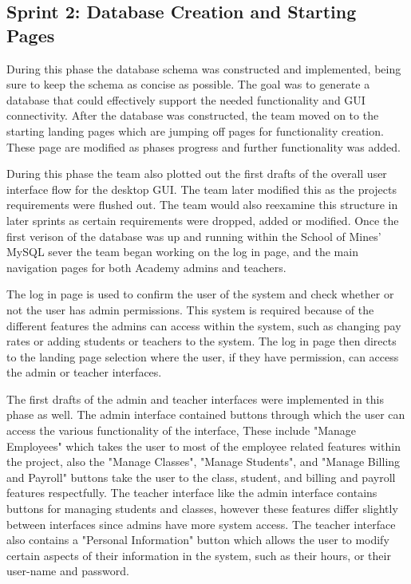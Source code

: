 \subsection{Sprint 2: Database Creation and Starting Pages}
During this phase the database schema was constructed and implemented, being sure to keep the schema as concise as possible. The goal was to generate a database that could effectively support the needed functionality and GUI connectivity. After the database was constructed, the team moved on to the starting landing pages which are jumping off pages for functionality creation. These page are modified as phases progress and further functionality was added.

During this phase the team also plotted out the first drafts of the overall user interface flow for the desktop GUI. The team later modified this as the projects requirements were flushed out. The team would also reexamine this structure in later sprints as certain requirements were dropped, added or modified. Once the first verison of the database was up and running within the School of Mines' MySQL sever the team began working on the log in page, and the main navigation pages for both Academy admins and teachers.

The log in page is used to confirm the user of the system and check whether or not the user has admin permissions. This system is required because of the different features the admins can access within the system, such as changing pay rates or adding students or teachers to the system. The log in page then directs to the landing page selection where the user, if they have permission, can access the admin or teacher interfaces.

The first drafts of the admin and teacher interfaces were implemented in this phase as well. The admin interface contained buttons through which the user can access the various functionality of the interface, These include "Manage Employees" which takes the user to most of the employee related features within the project, also the "Manage Classes", "Manage Students", and "Manage Billing and Payroll" buttons take the user to the class, student, and billing and payroll features respectfully. The teacher interface like the admin interface contains buttons for managing students and classes, however these features differ slightly between interfaces since admins have more system access. The teacher interface also contains a "Personal Information" button which allows the user to modify certain aspects of their information in the system, such as their hours, or their user-name and password. 

